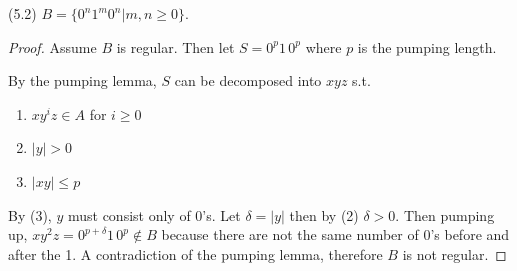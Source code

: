 \documentclass[11pt]{article}
\begin{document}
(5.2) $B=\{0^n1^m0^n|m,n\geq 0\}$.
\newline

\begin{proof}
Assume $B$ is regular. Then let $S = 0^p 1 \, 0^p$ where $p$ is the pumping length.

By the pumping lemma, $S$ can be decomposed into $xyz$ s.t.

\begin{enumerate}[(1)]
\item $xy^iz \in A$ for $i \geq 0$
\item $|y| > 0$
\item $|xy| \leq p$ 
\end{enumerate}

By (3), $y$ must consist only of 0's. Let $\delta = |y|$ then by (2) $\delta > 0$. Then pumping up, $xy^2z = 0^{p + \delta} 1 \, 0^p \notin B$ because there are not the same number of 0's before and after the 1. A contradiction of the pumping lemma, therefore $B$ is not regular.

\end{proof}
\end{document}
